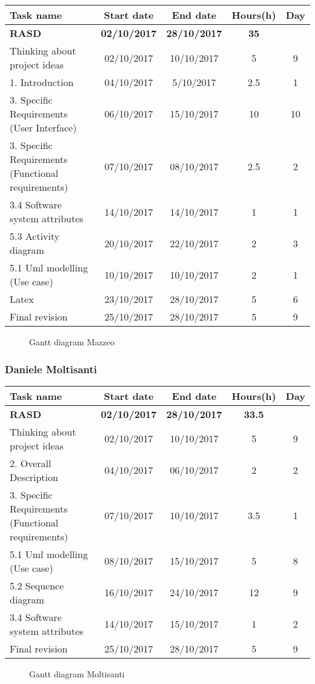 \begin{table}[h!]
	\begin{tabular}{lcccc}
		\toprule
		\textbf{Task name} & \textbf{Start date} & \textbf{End date} & \textbf{Hours(h)} & \textbf{Day} \\
		\midrule
		\textbf{RASD} & \textbf{02/10/2017} & \textbf{28/10/2017} & \textbf{35} &  \\
		Thinking about project ideas & 02/10/2017 & 10/10/2017 & 5 & 9 \\
		1. Introduction & 04/10/2017 & 5/10/2017 & 2.5 & 1 \\
		3. Specific Requirements (User Interface) & 06/10/2017 & 15/10/2017 & 10 & 10 \\
		3. Specific Requirements (Functional requirements) & 07/10/2017 & 08/10/2017 & 2.5 & 2 \\
		3.4 Software system attributes & 14/10/2017 & 14/10/2017 & 1 & 1 \\
		5.3 Activity diagram & 20/10/2017 & 22/10/2017 & 2 & 3 \\
		5.1 Uml modelling (Use case) & 10/10/2017 & 10/10/2017 & 2 & 1 \\
		Latex & 23/10/2017 & 28/10/2017 & 5 & 6 \\
		\bottomrule
		Final revision & 25/10/2017 & 28/10/2017 & 5 & 9 \\
	\end{tabular}
\end{table}

\begin{figure}[!h]
	\centering
	\caption{Gantt diagram Mazzeo}
\end{figure}
\clearpage

\subsubsection{Daniele Moltisanti}
\begin{table}[h!]
	\begin{tabular}{lcccc}
		\toprule
		\textbf{Task name} & \textbf{Start date} & \textbf{End date} & \textbf{Hours(h)} & \textbf{Day} \\
		\midrule
		\textbf{RASD} & \textbf{02/10/2017} & \textbf{28/10/2017} & \textbf{33.5} & \\
		Thinking about project ideas & 02/10/2017 & 10/10/2017 & 5 & 9 \\
		2. Overall Description & 04/10/2017 & 06/10/2017 & 2 & 2 \\
		3. Specific Requirements (Functional requirements) & 07/10/2017 & 10/10/2017 & 3.5 & 1 \\
		5.1 Uml modelling (Use case) & 08/10/2017 & 15/10/2017 & 5 & 8 \\
		5.2 Sequence diagram & 16/10/2017 & 24/10/2017 & 12 & 9 \\
		3.4 Software system attributes & 14/10/2017 & 15/10/2017 & 1 & 2 \\
		\bottomrule
		Final revision & 25/10/2017 & 28/10/2017 & 5 & 9 \\
	\end{tabular}
\end{table}

\begin{figure}[!h]
	\centering
	\caption{Gantt diagram Moltisanti}
\end{figure}
\clearpage